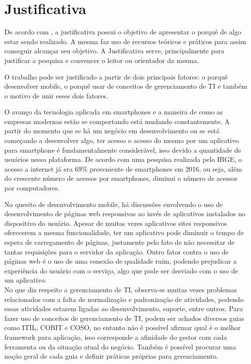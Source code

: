 \section{Justificativa}\label{sec:justification}
De acordo com \citet{marconi_lakatos_2010}, a justificativa possui o objetivo de apresentar o porquê de algo estar sendo realizado. A mesma faz uso de recursos teóricos e práticos para assim conseguir alcançar seu objetivo. A Justificativa serve, principalmente para justificar a pesquisa e convencer o leitor ou orientador da mesma.

O trabalho pode ser justificado a partir de dois principais fatores: o porquê desenvolver mobile, o porquê usar de conceitos de gerenciamento de TI e também o motivo de unir esses dois fatores. 

O avanço da tecnologia aplicada em smartphones e a maneira de como as empresas modernas estão se comportando está mudando constantemente. A partir do momento que se há um negócio em desenvolvimento ou se está começando a desenvolver algo, ter acesso o acesso do mesmo por um aplicativo para smartphone é fundamentalmente considerável, isso devido a quantidade de usuários nessa plataforma. De acordo com uma pesquisa realizada pelo IBGE, o acesso a internet já era 69\% proveniente de smartphones em 2016, ou seja, além do crescente número de acessos por smartphones, diminui o número de acessos por computadores.

No quesito de desenvolvimento mobile, há discussões envolvendo o uso de desenvolvimento de páginas web responsivas ao invés de aplicativos instalados no dispositivo do usuário. Apesar de muitas vezes aplicativos sites responsivos oferecerem a mesma funcionalidade, ter um aplicativo pode diminuir o tempo de espera de carregamento de páginas, justamente pelo fato de não necessitar de         tantas requisições para o servidor da aplicação. Outro fator contra o uso de páginas web é o uso de uma conexão de qualidade ruim, podendo prejudicar a experiência do usuário com o serviço, algo que pode ser desviado com o uso de um aplicativo.
\\

No que diz respeito a gerenciamento de TI, observa-se muitas vezes problemas relacionados com a falta de normalização e padronização de atividades, podendo essas atividades estarem ligadas ao desenvolvimento, suporte, entre outros. Para fazer uso de conceitos de gerenciamento de TI, podem ser achados diversos guias como ITIL, COBIT e COSO, no entanto não é possível afirmar qual é o melhor framework para aplicação, isso corresponde a afinidade do gestor com cada ferramenta ou da situação atual do negócio. Também é possível procurar uma noção geral de cada guia e definir práticas próprias para gerenciamento.

